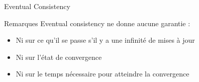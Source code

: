 \begin{frame}{Eventual Consistency}
  \vspace{-1mm}
  \begin{alertblock}{Remarques}
    \vspace{-1mm}
    Eventual consistency ne donne aucune garantie :
    \begin{itemize}
    \item Ni sur ce qu'il se passe s'il y a une infinité de mises à jour
    \item Ni sur l'état de convergence
    \item Ni sur le temps nécessaire pour atteindre la convergence
    \end{itemize}
  \end{alertblock}

  
\end{frame}

\endgroup
\endinput

